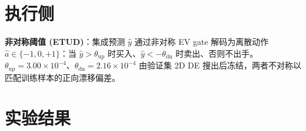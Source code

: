 \documentclass[10pt,twocolumn]{article}
\newcommand{\hl}[1]{\textcolor{lblue}{\textbf{#1}}}
\newcommand{\hlC}[1]{\hl{#1}}
\begin{document}
\section{执行侧}
\hlC{非对称阈值 (ETUD)}：集成预测 $\hat y$ 通过非对称 EV gate 解码为离散动作 $\hat a \in \{-1, 0, +1\}$：当 $\hat y > \theta_{\mathrm{up}}$ 时买入、$\hat y < -\theta_{\mathrm{dn}}$ 时卖出、否则不出手。$\theta_{\mathrm{up}}{=}3.00{\times}10^{-4}$、$\theta_{\mathrm{dn}}{=}2.16{\times}10^{-4}$ 由验证集 2D DE 搜出后冻结，两者不对称以匹配训练样本的正向漂移偏差。

\section{实验结果}
\end{document}
